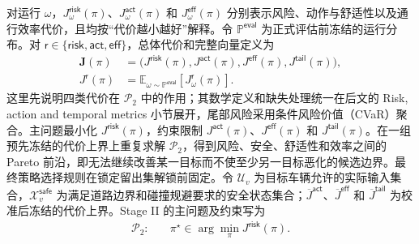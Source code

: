 \documentclass[10pt,a4paper,twocolumn]{article}
\begin{document}
对运行 $\omega$，$J_\omega^{\mathsf{risk}}(\pi)$、$J_\omega^{\mathsf{act}}(\pi)$ 和 $J_\omega^{\mathsf{eff}}(\pi)$ 分别表示风险、动作与舒适性以及通行效率代价，且均按“代价越小越好”解释。令 $\mathbb P^{\mathsf{eval}}$ 为正式评估前冻结的运行分布。对 $\mathsf r\in\{\mathsf{risk},\mathsf{act},\mathsf{eff}\}$，总体代价和完整向量定义为
\begin{equation*}
\begin{aligned}
\bm J(\pi)&=\bigl(J^{\mathsf{risk}}(\pi),J^{\mathsf{act}}(\pi),
J^{\mathsf{eff}}(\pi),J^{\mathsf{tail}}(\pi)\bigr),\\
J^{\mathsf r}(\pi)&=\mathbb E_{\omega\sim\mathbb P^{\mathsf{eval}}}
\!\left[J_\omega^{\mathsf r}(\pi)\right].
\end{aligned}
\end{equation*}
这里先说明四类代价在 $\mathcal P_2$ 中的作用；其数学定义和缺失处理统一在后文的 Risk, action and temporal metrics 小节展开，尾部风险采用条件风险价值（CVaR）聚合。主问题最小化 $J^{\mathsf{risk}}(\pi)$，约束限制 $J^{\mathsf{act}}(\pi)$、$J^{\mathsf{eff}}(\pi)$ 和 $J^{\mathsf{tail}}(\pi)$。在一组预先冻结的代价上界上重复求解 $\mathcal P_2$，得到风险、安全、舒适性和效率之间的 Pareto 前沿，即无法继续改善某一目标而不使至少另一目标恶化的候选边界。最终策略选择规则在锁定留出集解锁前固定。令 $\mathcal U_v$ 为目标车辆允许的实际输入集合，$\mathcal X_v^{\mathsf{safe}}$ 为满足道路边界和碰撞规避要求的安全状态集合；$\overline J^{\mathsf{act}}$、$\overline J^{\mathsf{eff}}$ 和 $\overline J^{\mathsf{tail}}$ 为校准后冻结的代价上界。Stage II 的主问题及约束写为
\begin{equation}\label{eq:P2}
\begin{aligned}
\mathcal P_2:\quad
&\pi^\star\in\arg\min_{\pi}
J^{\mathsf{risk}}(\pi).
\end{aligned}
\end{equation}
\addtocounter{equation}{-1}
\allowdisplaybreaks[4]
\end{document}
